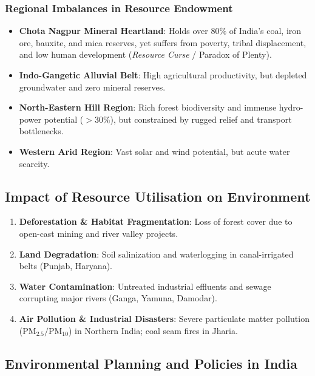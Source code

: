 \documentclass[11pt,a4paper]{article}
\begin{document}
\subsubsection{Regional Imbalances in Resource Endowment}
\begin{itemize}[leftmargin=*]
  \item \textbf{Chota Nagpur Mineral Heartland}: Holds over $80\%$ of India's coal, iron ore, bauxite, and mica reserves, yet suffers from poverty, tribal displacement, and low human development (\textit{Resource Curse} / Paradox of Plenty).
  \item \textbf{Indo-Gangetic Alluvial Belt}: High agricultural productivity, but depleted groundwater and zero mineral reserves.
  \item \textbf{North-Eastern Hill Region}: Rich forest biodiversity and immense hydro-power potential ($>30\%$), but constrained by rugged relief and transport bottlenecks.
  \item \textbf{Western Arid Region}: Vast solar and wind potential, but acute water scarcity.
\end{itemize}

\subsection{Impact of Resource Utilisation on Environment}
\begin{enumerate}[leftmargin=*]
  \item \textbf{Deforestation \& Habitat Fragmentation}: Loss of forest cover due to open-cast mining and river valley projects.
  \item \textbf{Land Degradation}: Soil salinization and waterlogging in canal-irrigated belts (Punjab, Haryana).
  \item \textbf{Water Contamination}: Untreated industrial effluents and sewage corrupting major rivers (Ganga, Yamuna, Damodar).
  \item \textbf{Air Pollution \& Industrial Disasters}: Severe particulate matter pollution ($\text{PM}_{2.5}/\text{PM}_{10}$) in Northern India; coal seam fires in Jharia.
\end{enumerate}

\subsection{Environmental Planning and Policies in India}
\end{document}
